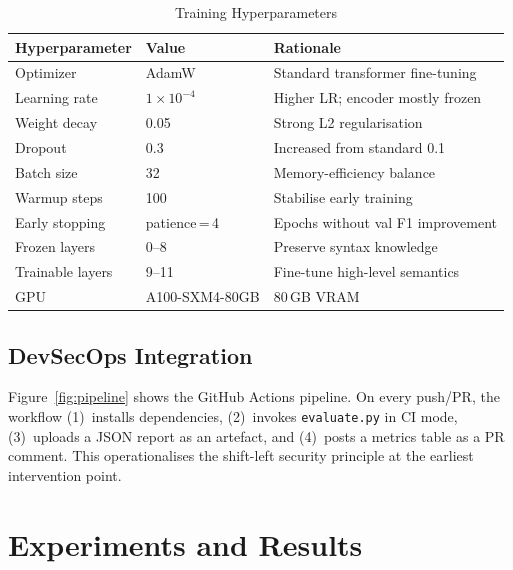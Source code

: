 \documentclass[12pt, letterpaper]{article}
\begin{document}
\begin{table}[H]
\centering
\caption{Training Hyperparameters}
\label{tab:hyperparams}
\begin{tabular}{L{4.5cm}L{3cm}L{6cm}}
\toprule
\textbf{Hyperparameter}&\textbf{Value}&\textbf{Rationale}\\
\midrule
Optimizer         & AdamW            & Standard transformer fine-tuning\\
Learning rate     & $1\times10^{-4}$ & Higher LR; encoder mostly frozen\\
Weight decay      & 0.05             & Strong L2 regularisation\\
Dropout           & 0.3              & Increased from standard 0.1\\
Batch size        & 32               & Memory-efficiency balance\\
Warmup steps      & 100              & Stabilise early training\\
Early stopping    & patience\,=\,4   & Epochs without val F1 improvement\\
Frozen layers     & 0--8             & Preserve syntax knowledge\\
Trainable layers  & 9--11            & Fine-tune high-level semantics\\
GPU               & A100-SXM4-80GB   & 80\,GB VRAM\\
\bottomrule
\end{tabular}
\end{table}

\subsection{DevSecOps Integration}

Figure~\ref{fig:pipeline} shows the GitHub Actions pipeline. On every push/PR,
the workflow (1)~installs dependencies, (2)~invokes \texttt{evaluate.py} in CI
mode, (3)~uploads a JSON report as an artefact, and (4)~posts a metrics table
as a PR comment. This operationalises the shift-left security principle at the
earliest intervention point.

\section{Experiments and Results}
\end{document}
